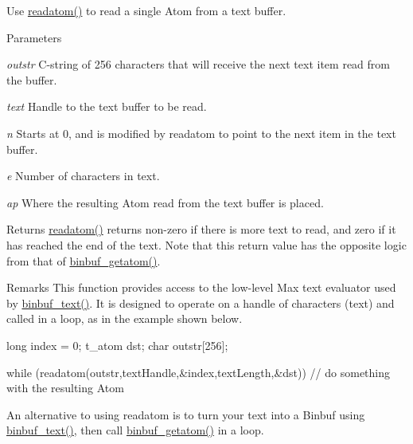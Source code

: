 Use \hyperlink{group__binbuf_gacb42118a4da090a6d47954f8b299de46}{readatom()} to read a single Atom from a text buffer. 
\begin{DoxyParams}{Parameters}
\item[{\em outstr}]C-\/string of 256 characters that will receive the next text item read from the buffer. \item[{\em text}]Handle to the text buffer to be read. \item[{\em n}]Starts at 0, and is modified by readatom to point to the next item in the text buffer. \item[{\em e}]Number of characters in text. \item[{\em ap}]Where the resulting Atom read from the text buffer is placed. \end{DoxyParams}
\begin{DoxyReturn}{Returns}
\hyperlink{group__binbuf_gacb42118a4da090a6d47954f8b299de46}{readatom()} returns non-\/zero if there is more text to read, and zero if it has reached the end of the text. Note that this return value has the opposite logic from that of \hyperlink{group__binbuf_ga0eccee2d50ae561c625cc97238f1e21a}{binbuf\_\-getatom()}.
\end{DoxyReturn}
\begin{DoxyRemark}{Remarks}
This function provides access to the low-\/level Max text evaluator used by \hyperlink{group__binbuf_ga7a582c876ee074505762b30c7eef6504}{binbuf\_\-text()}. It is designed to operate on a handle of characters (text) and called in a loop, as in the example shown below. 
\begin{DoxyCode}
    long index = 0; 
    t_atom dst; 
    char outstr[256]; 
    
    while (readatom(outstr,textHandle,&index,textLength,&dst)) 
    { 
        // do something with the resulting Atom
    } 
\end{DoxyCode}


An alternative to using readatom is to turn your text into a Binbuf using \hyperlink{group__binbuf_ga7a582c876ee074505762b30c7eef6504}{binbuf\_\-text()}, then call \hyperlink{group__binbuf_ga0eccee2d50ae561c625cc97238f1e21a}{binbuf\_\-getatom()} in a loop. 
\end{DoxyRemark}
